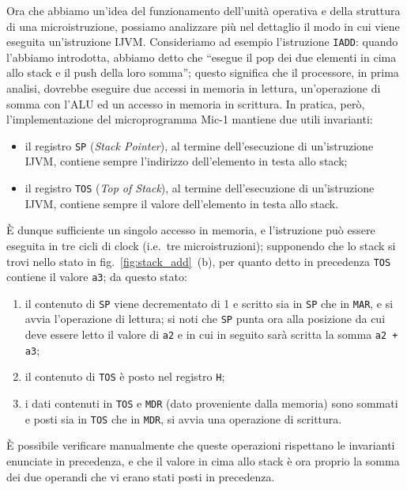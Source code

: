 \documentclass[a4paper,12pt]{scrreprt}
\begin{document}
Ora che abbiamo un'idea del funzionamento dell'unità operativa e della struttura
di una microistruzione, possiamo analizzare più nel dettaglio il modo in cui
viene eseguita un'istruzione IJVM. Consideriamo ad esempio l'istruzione
\lstinline{IADD}: quando l'abbiamo introdotta, abbiamo detto che ``esegue il pop
dei due elementi in cima allo stack e il push della loro somma''; questo
significa che il processore, in prima analisi, dovrebbe eseguire due accessi in
memoria in lettura, un'operazione di somma con l'ALU ed un accesso in memoria in
scrittura. In pratica, però, l'implementazione del microprogramma Mic-1 mantiene
due utili invarianti:
\begin{itemize}
  \item il registro \lstinline{SP} (\textit{Stack Pointer}), al termine dell'esecuzione
  di un'istruzione IJVM, contiene sempre l'indirizzo dell'elemento in testa allo
  stack;
  \item il registro \lstinline{TOS} (\textit{Top of Stack}), al termine dell'esecuzione
  di un'istruzione IJVM, contiene sempre il valore dell'elemento in testa allo
  stack.
\end{itemize}

È dunque sufficiente un singolo accesso in memoria, e l'istruzione può essere
eseguita in tre cicli di clock (i.e.~tre microistruzioni); supponendo che lo
stack si trovi nello stato in fig.~\ref{fig:stack_add}~(b), per quanto detto in
precedenza \lstinline{TOS} contiene il valore \lstinline{a3}; da questo stato:
\begin{enumerate}
  \item il contenuto di \lstinline{SP} viene decrementato di 1 e scritto sia in
  \lstinline{SP} che in \lstinline{MAR}, e si avvia l'operazione di lettura; si
  noti che \lstinline{SP} punta ora alla posizione da cui deve essere letto il
  valore di \lstinline{a2} e in cui in seguito sarà scritta la somma
  \lstinline{a2 + a3};
  \item il contenuto di \lstinline{TOS} è posto nel registro \lstinline{H};
  \item i dati contenuti in \lstinline{TOS} e \lstinline{MDR} (dato proveniente
  dalla memoria) sono sommati e posti sia in \lstinline{TOS} che in
  \lstinline{MDR}, si avvia una operazione di scrittura.
\end{enumerate}
È possibile verificare manualmente che queste operazioni rispettano le
invarianti enunciate in precedenza, e che il valore in cima allo stack è ora
proprio la somma dei due operandi che vi erano stati posti in precedenza.
\end{document}

